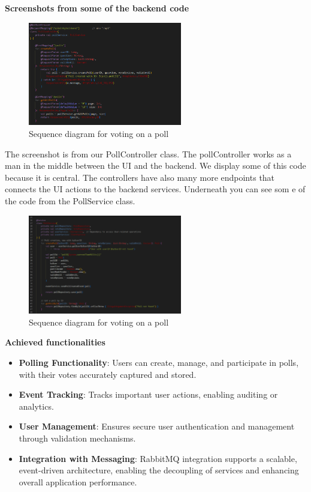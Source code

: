 \noindent \textbf{Screenshots from some of the backend code}

\begin{figure}[H]
	\centering
	\includegraphics[width=0.6\textwidth]{../images/pollController.png}
	\caption{Sequence diagram for voting on a poll}
	\label{fig:pollController}
\end{figure}

\noindent The screenshot is from our PollController class. The pollController works as a man in the middle between the UI and the backend. We display some of this code because it is central. The controllers have also many more endpoints that connects the UI actions to the backend services. Underneath you can see som e of the code from the PollService class.

\begin{figure}[H]
	\centering
	\includegraphics[width=0.6\textwidth]{../images/pollService.png}
	\caption{Sequence diagram for voting on a poll}
	\label{fig:pollService}
\end{figure}

\vspace{0.5cm}
\noindent \textbf{Achieved functionalities}
\begin{itemize}
    \item \textbf{Polling Functionality}: Users can create, manage, and participate in polls, with their votes accurately captured and stored.
    \item \textbf{Event Tracking}: Tracks important user actions, enabling auditing or analytics.
    \item \textbf{User Management}: Ensures secure user authentication and management through validation mechanisms.
    \item \textbf{Integration with Messaging}: RabbitMQ integration supports a scalable, event-driven architecture, enabling the decoupling of services and enhancing overall application performance.
\end{itemize}